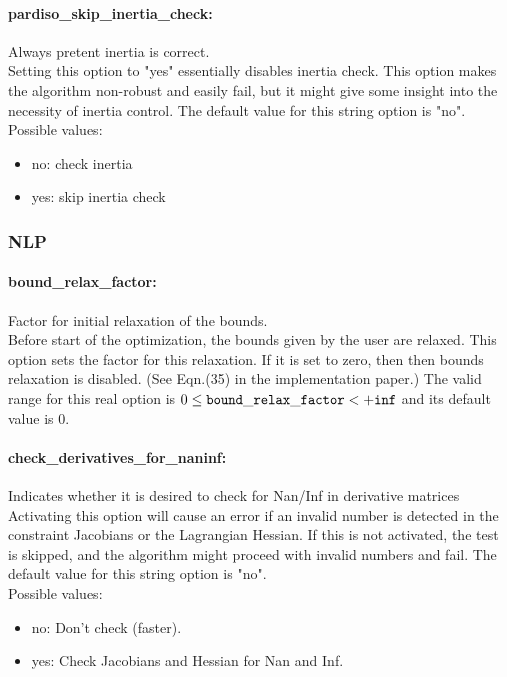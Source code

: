 \paragraph{pardiso\_skip\_inertia\_check:}\label{sec:pardiso_skip_inertia_check} Always pretent inertia is correct. $\;$ \\
 Setting this option to "yes" essentially disables
inertia check. This option makes the algorithm
non-robust and easily fail, but it might give
some insight into the necessity of inertia
control.
The default value for this string option is "no".
\\ 
Possible values:
\begin{itemize}
   \item no: check inertia
   \item yes: skip inertia check
\end{itemize}

\subsubsection{NLP}
\label{sec:NLP}

\paragraph{bound\_relax\_factor:}\label{sec:bound_relax_factor} Factor for initial relaxation of the bounds. $\;$ \\
 Before start of the optimization, the bounds
given by the user are relaxed.  This option sets
the factor for this relaxation.  If it is set to
zero, then then bounds relaxation is disabled.
(See Eqn.(35) in the implementation paper.) The valid range for this real option is 
$0 \le {\tt bound\_relax\_factor } <  {\tt +inf}$
and its default value is $0$.


\paragraph{check\_derivatives\_for\_naninf:}\label{sec:check_derivatives_for_naninf} Indicates whether it is desired to check for Nan/Inf in derivative matrices $\;$ \\
 Activating this option will cause an error if an
invalid number is detected in the constraint
Jacobians or the Lagrangian Hessian.  If this is
not activated, the test is skipped, and the
algorithm might proceed with invalid numbers and
fail.
The default value for this string option is "no".
\\ 
Possible values:
\begin{itemize}
   \item no: Don't check (faster).
   \item yes: Check Jacobians and Hessian for Nan and Inf.
\end{itemize}

